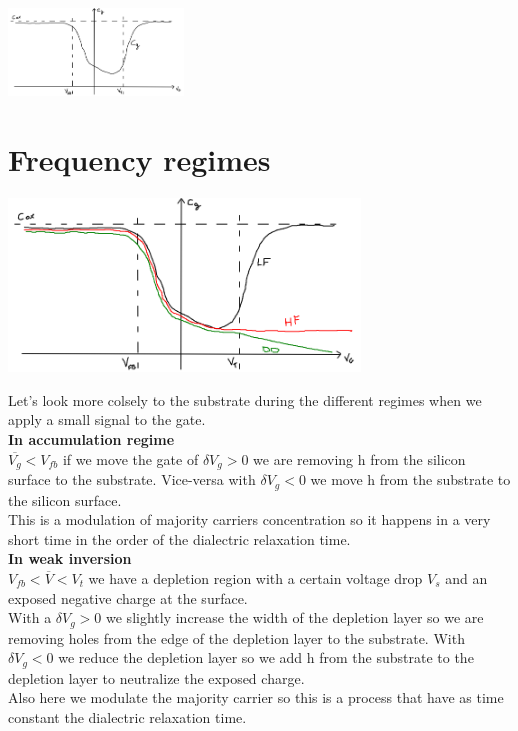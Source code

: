 \centering
\includegraphics[width=0.35\textwidth]{c-g1.png}\\
\raggedright



\section{Frequency regimes}
\centering
\includegraphics[width=0.7\textwidth]{c-gtot.png}\\
\raggedright

Let's look more colsely to the substrate during the different regimes when we apply a small signal to the gate.\\

\vspace{5mm}
{\bf In accumulation regime}\\
$\overline{V_g}<V_{fb}$ if we move the gate of $\delta V_g>0$ we are removing h from the silicon surface to the substrate. Vice-versa with $\delta V_g<0$ we move h from the substrate to the silicon surface.\\
This is a modulation of majority carriers concentration so it happens in a very short time in the order of the dialectric relaxation time.\\

\vspace{5mm}
{\bf In weak inversion}\\
$V_{fb}<\overline{V}<V_t$ we have a depletion region with a certain voltage drop $V_s$ and an exposed negative charge at the surface.\\
With a $\delta V_g>0$ we slightly increase the width of the depletion layer so we are removing holes from the edge of the depletion layer to the substrate. With $\delta V_g<0$ we reduce the depletion layer so we add h from the substrate to the depletion layer to neutralize the exposed charge.\\
Also here we modulate the majority carrier so this is a process that have as time constant the dialectric relaxation time.\\

